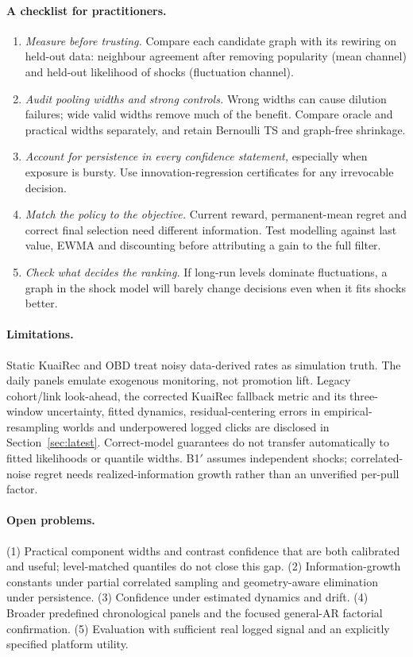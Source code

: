 \documentclass[11pt]{article}
\theoremstyle{definition}
\theoremstyle{remark}
\begin{document}
\paragraph{A checklist for practitioners.}
\begin{enumerate}
\item \emph{Measure before trusting.} Compare each candidate graph with its rewiring on held-out data: neighbour agreement after removing popularity (mean channel) and held-out likelihood of shocks (fluctuation channel).
\item \emph{Audit pooling widths and strong controls.} Wrong widths can cause dilution failures; wide valid widths remove much of the benefit. Compare oracle and practical widths separately, and retain Bernoulli TS and graph-free shrinkage.
\item \emph{Account for persistence in every confidence statement,} especially when exposure is bursty. Use innovation-regression certificates for any irrevocable decision.
\item \emph{Match the policy to the objective.} Current reward, permanent-mean regret and correct final selection need different information. Test modelling against last value, EWMA and discounting before attributing a gain to the full filter.
\item \emph{Check what decides the ranking.} If long-run levels dominate fluctuations, a graph in the shock model will barely change decisions even when it fits shocks better.
\end{enumerate}

\paragraph{Limitations.} Static KuaiRec and OBD treat noisy data-derived rates as simulation truth. The daily panels emulate exogenous monitoring, not promotion lift. Legacy cohort/link look-ahead, the corrected KuaiRec fallback metric and its three-window uncertainty, fitted dynamics, residual-centering errors in empirical-resampling worlds and underpowered logged clicks are disclosed in Section~\ref{sec:latest}. Correct-model guarantees do not transfer automatically to fitted likelihoods or quantile widths. B1$'$ assumes independent shocks; correlated-noise regret needs realized-information growth rather than an unverified per-pull factor.

\paragraph{Open problems.} (1) Practical component widths and contrast confidence that are both calibrated and useful; level-matched quantiles do not close this gap. (2) Information-growth constants under partial correlated sampling and geometry-aware elimination under persistence. (3) Confidence under estimated dynamics and drift. (4) Broader predefined chronological panels and the focused general-AR factorial confirmation. (5) Evaluation with sufficient real logged signal and an explicitly specified platform utility.
\end{document}
